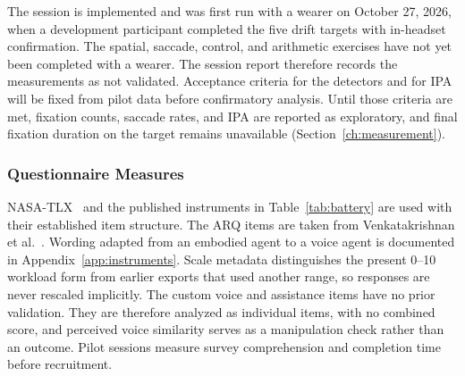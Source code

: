 The session is implemented and was first run with a wearer on October 27, 2026, when a development participant completed the five drift targets with in-headset confirmation. The spatial, saccade, control, and arithmetic exercises have not yet been completed with a wearer. The session report therefore records the measurements as not validated. Acceptance criteria for the detectors and for IPA will be fixed from pilot data before confirmatory analysis. Until those criteria are met, fixation counts, saccade rates, and IPA are reported as exploratory, and final fixation duration on the target remains unavailable (Section~\ref{ch:measurement}).

\subsubsection{Questionnaire Measures}
NASA-TLX~\cite{hart1988nasatlx} and the published instruments in Table~\ref{tab:battery} are used with their established item structure. The ARQ items are taken from Venkatakrishnan et al.~\cite{venkatakrishnan2026clarifying}. Wording adapted from an embodied agent to a voice agent is documented in Appendix~\ref{app:instruments}. Scale metadata distinguishes the present 0--10 workload form from earlier exports that used another range, so responses are never rescaled implicitly. The custom voice and assistance items have no prior validation. They are therefore analyzed as individual items, with no combined score, and perceived voice similarity serves as a manipulation check rather than an outcome. Pilot sessions measure survey comprehension and completion time before recruitment.
